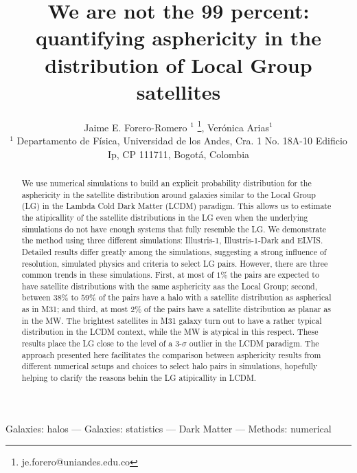 \documentclass[a4paper,fleqn,usenatbib]{mnras}
\begin{document}
\title[LG satellites distribution asphericity]{We are not the 99 percent: quantifying
  asphericity in the distribution of Local Group satellites}
\author[J.E. Forero-Romero \& V. Arias]
{Jaime E. Forero-Romero $^{1}$ \thanks{je.forero@uniandes.edu.co},
Ver\'onica Arias$^1$\\
$^1$ Departamento de F\'isica, Universidad de los Andes, Cra. 1
  No. 18A-10 Edificio Ip, CP 111711, Bogot\'a, Colombia \\
}

\maketitle

\begin{abstract}
We use numerical simulations to build an explicit probability
distribution for the asphericity in the satellite distribution around
galaxies similar to the Local Group (LG) in the Lambda Cold Dark
Matter (LCDM) paradigm. 
This allows us to estimate the atipicallity
of the satellite distributions in the LG even when the underlying
simulations do not have enough systems that fully resemble the LG.
We demonstrate the method using three different simulations:
Illustris-1,  Illustris-1-Dark and ELVIS. 
Detailed results differ greatly among the simulations, suggesting a
strong influence of resolution, simulated physics and criteria to select
LG pairs.
However, there are three common trends in these simulations. 
First, at most of $1\%$ the pairs are expected to have satellite
distributions with the same asphericity aas the Local Group; second,
between $38\%$ to $59\%$ of the pairs have a halo with a satellite
distribution as aspherical as in M31; and third, at most $2\%$ of the
pairs have a satellite distribution as planar as in the MW. 
The brightest satellites in M31 galaxy turn out to have a rather
typical distribution in the LCDM context, while the MW is atypical in
this respect.  
These results place the LG close to the level of a 3-$\sigma$ outlier
in the LCDM paradigm. 
The approach presented here facilitates the comparison between
asphericity results from different numerical setups and choices to
select halo pairs in simulations, hopefully helping to clarify the
reasons behin the LG atipicallity in LCDM. 
\end{abstract}

\begin{keywords}Galaxies: halos --- Galaxies: statistics --- Dark
  Matter --- Methods: numerical  
\end{keywords}
\end{document}
